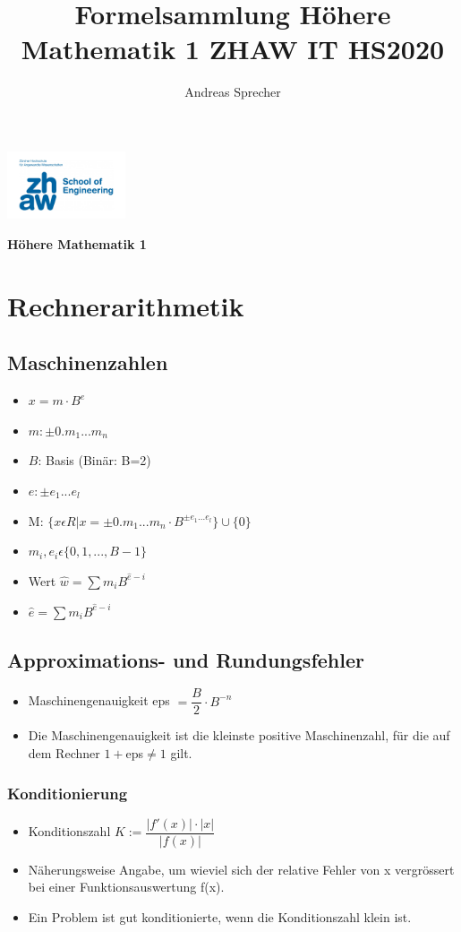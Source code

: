 \documentclass[8pt,a4paper]{scrartcl}
\title{Formelsammlung Höhere Mathematik 1 ZHAW IT HS2020}
\author{Andreas Sprecher}
\renewcommand{\emph}[1]{\textbf{#1}}                                                            %
\begin{document}
\begin{multicols*}{3}
\setlength{\columnseprule}{0.4pt}
    \parbox{4cm}{
        \includegraphics[height=2cm]{./img/Logo.jpeg}
    }
    \parbox{4cm}{
        \emph{\Large{Höhere Mathematik 1}}
    }
    \vspace{-2mm} 

	\section{Rechnerarithmetik}
		\subsection{Maschinenzahlen}
			\begin{itemize}\itemsep0pt				
				\item $x = m \cdot B^{e}$
				\item $m: \pm 0.m_{1}...m_{n}$
				\item $B$: Basis (Binär: B=2)
				\item $e: \pm e_{1}...e_{l}$
				\item M: $\{x\epsilon R | x = \pm 0.m_{1}...m_{n}\cdot B^{\pm e_{1}...e_{l}}\} \cup \{0\}$
				\item $m_{i}, e_{i}\epsilon\{0,1,..., B-1\}$	
				\item Wert $\hat{w} = \sum m_{i}B^{\hat{e}-i}$
				\item $\hat{e} = \sum m_{i}B^{\hat{e}-i}$
			\end{itemize}
		\subsection{Approximations- und Rundungsfehler}
			\begin{itemize}\itemsep0pt	
				\item Maschinengenauigkeit eps $=\dfrac{B}{2}\cdot B^{-n}$
				\item Die Maschinengenauigkeit ist die kleinste positive Maschinenzahl, für die auf dem Rechner $1 + $eps$  \neq 1$ gilt.
			\end{itemize}		
		
			\subsubsection{Konditionierung}
    				\begin{itemize}\itemsep0pt			
    					\item Konditionszahl $K:= \dfrac{|f'(x)|\cdot |x|}{|f(x)|} $
    					\item Näherungsweise Angabe, um wieviel sich der relative Fehler von x vergrössert bei einer Funktionsauswertung f(x).
    					\item Ein Problem ist gut konditionierte, wenn die Konditionszahl klein ist.


\end{itemize}
\end{multicols*}
\end{document}
